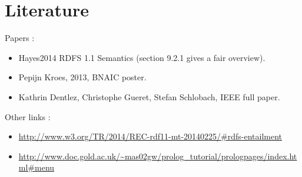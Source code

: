 \documentclass{article}
\newenvironment{itemh}[0]{\begin{itemize}[label=$\heartsuit$, font=\color{gray} \small]}{\end{itemize}}
\begin{document}
\section{Literature}
	Papers :
	\begin{itemh}
		\item Hayes2014 RDFS 1.1 Semantics (section 9.2.1 gives a fair overview).
		\item Pepijn Kroes, 2013, BNAIC poster.
		\item Kathrin Dentlez, Christophe Gueret, Stefan Schlobach, IEEE full paper.
	\end{itemh}
	Other links :
	\begin{itemh}
		\item\url{http://www.w3.org/TR/2014/REC-rdf11-mt-20140225/#rdfs-entailment}
		\item \url{http://www.doc.gold.ac.uk/~mas02gw/prolog_tutorial/prologpages/index.html#menu}
	\end{itemh}
\end{document}
